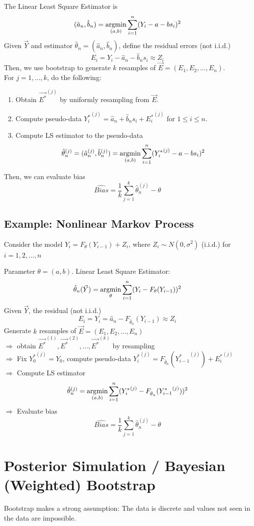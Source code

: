 \documentclass[11pt]{elegantbook}
\newcommand{\argmin}{\operatornamewithlimits{argmin}}
\begin{document}
The Linear Least Square Estimator is
$$(\hat{a}_n,\hat{b}_n)=\argmin_{(a,b)}\sum_{i=1}^n(Y_i-a-bs_i)^2$$
Given $\vec{Y}$ and estimator $\hat{\theta}_n=(\hat{a}_n,\hat{b}_n)$, define the residual errors (not i.i.d.)$$E_i=Y_i-\hat{a}_n-\hat{b}_ns_i\approx Z_i$$
Then, we use bootstrap to generate $k$ resamples of $\vec{E}=(E_1,E_2,...,E_n)$.\\
For $j=1,...,k$, do the following:
\begin{enumerate}
    \item Obtain $\vec{E^*}^{(j)}$ by uniformly resampling from $\vec{E}$.
    \item Compute pseudo-data ${Y_i^*}^{(j)}=\hat{a}_n+\hat{b}_ns_i+{E_i^*}^{(j)}$ for $1\leq i\leq n$.
    \item Compute LS estimator to the pseudo-data $$\hat{\theta}_n^{(j)}=(\hat{a}_n^{(j)},\hat{b}_n^{(j)})=\argmin_{(a,b)}\sum_{i=1}^n({Y_i^*}^{(j)}-a-bs_i)^2$$
\end{enumerate}
Then, we can evaluate bias $$\widehat{Bias}=\frac{1}{k}\sum_{j=1}^k \hat{\theta}_n^{(j)}-\theta$$

\subsection{Example: Nonlinear Markov Process}
Consider the model $Y_i=F_{\theta}(Y_{i-1})+Z_i$, where $Z_i\sim N(0,\sigma^2)$ (i.i.d.) for $i=1,2,...,n$

Parameter $\theta=(a,b)$. Linear Least Square Estimator:
$$\hat{\theta}_n(\vec{Y})=\argmin_{\theta}\sum_{i=1}^n(Y_i-F_{\theta}(Y_{i-1}))^2$$
Given $\vec{Y}$, the residual (not i.i.d.)$$E_i=Y_i=\hat{a}_n-F_{\hat{\theta}_n}(Y_{i-1})\approx Z_i$$
Generate $k$ resamples of $\vec{E}=(E_1,E_2,...,E_n)$\\
$\Rightarrow$ obtain $\vec{E^*}^{(1)},\vec{E^*}^{(2)},...,\vec{E^*}^{(k)}$ by resampling\\
$\Rightarrow$ Fix ${Y_0^*}^{(j)}=Y_0$, compute pseudo-data ${Y_i^*}^{(j)}=F_{\hat{\theta}_n}({Y^*_{i-1}}^{(j)})+{E_i^*}^{(j)}$\\
$\Rightarrow$ Compute LS estimator $$\hat{\theta}_n^{(j)}=\argmin_{(a,b)}\sum_{i=1}^n({Y_i^*}^{(j)}-F_{\hat{\theta}_n}({Y^*_{i-1}}^{(j)}))^2$$
$\Rightarrow$ Evaluate bias $$\widehat{Bias}=\frac{1}{k}\sum_{j=1}^k \hat{\theta}_n^{(j)}-\theta$$


\section{Posterior Simulation / Bayesian (Weighted) Bootstrap}
\begin{assumption}
    Bootstrap makes a strong assumption: The data is discrete and values not seen in the data are impossible.
\end{assumption}
\end{document}
